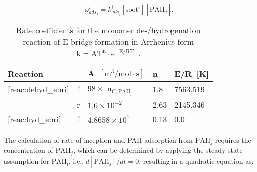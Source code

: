 \begin{equation}
	\omega^i_{ads_j} = k^i_{ads_{j}} [\mathrm{soot}^i] [\mathrm{\dot{PAH}}_j].
\end{equation}



\renewcommand{\arraystretch}{1.5}
\begin{table}
	\caption{Rate coefficients for the monomer de-/hydrogenation reaction of E-bridge formation in Arrhenius form $\mathrm{k=AT^n\cdot e^{-E/RT}}$~\citep{frenklach2020mechanism}.}
	\label{tab:Ebridge}
	\centering
	\begin{tabular}{l l l l l}
		\hline
		Reaction & \hspace{0.1cm} & A~$\mathrm{\left[{m^3}/{mol\cdot s} \right]}$ & n & {E}/{R}~[K]  \\
		\hline
		\eqref{reac:dehyd_ebri} & f & $98\times$ $\mathrm{n_{C, PAH_j}}$ & 1.8 & 7563.519 \\
		& r & $1.6\times 10^{-2}$ & 2.63 & 2145.346\\
		\eqref{reac:hyd_ebri} & f & $4.8658\times10^7
		$ & 0.13 & 0.0\\
		\hline
	\end{tabular}
\end{table}



The calculation of rate of inception and PAH adsorption from $\mathrm{PAH}_j$ requires the concentration of $\mathrm{\dot{PAH}}_j$, which can be determined by applying the steady-state assumption for $\mathrm{\dot{PAH}_j}$, i.e., $d[\mathrm{\dot{PAH}}_j]/dt=0$, resulting in a quadratic equation as:




